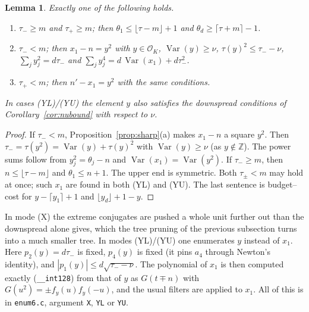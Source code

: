 \documentclass[11pt]{amsart}
\newtheorem{lemma}[theorem]{Lemma}
\theoremstyle{definition}
\DeclareMathOperator{\Var}{Var}
\newcommand{\OK}{\mathcal{O}_K}
\newcommand{\Z}{\mathbb{Z}}
\newcommand{\file}[1]{\texttt{#1}}
\begin{document}
\begin{lemma}\label{lem:rung}
Exactly one of the following holds.
\begin{enumerate}[label=(\roman*)]
\item[(X)] $\tau_-\ge m$ and $\tau_+\ge m$; then $\theta_1\le\lfloor\tau-m\rfloor+1$ and
  $\theta_d\ge\lceil\tau+m\rceil-1$.
\item[(YL)] $\tau_-<m$; then $x_1-n=y^2$ with $y\in\OK$, $\Var(y)\ge\nu$,
  $\tau(y)^2\le\tau_--\nu$, $\sum_j y_j^2=d\tau_-$ and
  $\sum_j y_j^4=d\,\Var(x_1)+d\tau_-^2$.
\item[(YU)] $\tau_+<m$; then $n'-x_1=y^2$ with the same conditions.
\end{enumerate}
In cases (YL)/(YU) the element $y$ also satisfies the downspread conditions of
Corollary~\ref{cor:nubound} with respect to $\nu$.
\end{lemma}

\begin{proof}
If $\tau_-<m$, Proposition~\ref{prop:sharp}(a) makes $x_1-n$ a square $y^2$.  Then
$\tau_-=\tau(y^2)=\Var(y)+\tau(y)^2$ with $\Var(y)\ge\nu$ (as $y\notin\Z$).  The power sums
follow from $y_j^2=\theta_j-n$ and $\Var(x_1)=\Var(y^2)$.  If $\tau_-\ge m$, then
$n\le\lfloor\tau-m\rfloor$ and $\theta_1\le n+1$.  The upper end is symmetric.  Both
$\tau_\pm<m$ may hold at once; such $x_1$ are found in both (YL) and (YU).  The last
sentence is budget--cost for $y-\lceil y_1\rceil+1$ and $\lfloor y_d\rfloor+1-y$.
\end{proof}

In mode (X) the extreme conjugates are pushed a whole unit further out than the downspread
alone gives, which the tree pruning of the previous subsection turns into a much smaller
tree.  In modes (YL)/(YU) one enumerates $y$ instead of $x_1$.  Here $p_2(y)=d\tau_-$ is fixed,
$p_4(y)$ is fixed (it pins $a_4$ through Newton's identity), and $|p_1(y)|\le d\sqrt{\tau_--\nu}$.
The polynomial of $x_1$ is then computed exactly (\texttt{\_\_int128}) from that of $y$ as
$G(t\mp n)$ with $G(u^2)=\pm f_y(u)f_y(-u)$, and the usual filters are applied to $x_1$.
All of this is in \file{enum6.c}, argument \texttt{X}, \texttt{YL} or \texttt{YU}.
\end{document}
